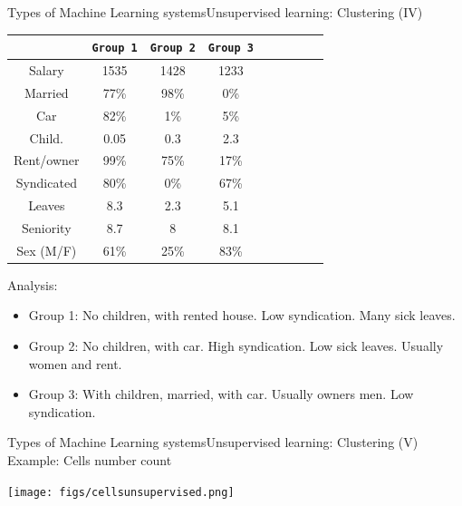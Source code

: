 \documentclass[10pt,compress]{beamer} %
\begin{document}
\begin{frame}{Types of Machine Learning systems}{Unsupervised learning: Clustering (IV)}

	\begin{center}
	\begin{tabular}{ccccccccc}\hline
				    & \texttt{Group 1} & \texttt{Group 2} & \texttt{Group 3} \\\hline
		 Salary     & 1535    		   & 1428             & 1233       \\
		 Married    & 77\%    		   & 98\% 			  & 0\%        \\
		 Car        & 82\%    		   & 1\% 			  & 5\%        \\
		 Child.     & 0.05    		   & 0.3 			  & 2.3        \\
		 Rent/owner & 99\%    		   & 75\% 			  & 17\%       \\
		 Syndicated & 80\%    		   & 0\% 			  & 67\%       \\
		 Leaves     & 8.3     		   & 2.3 			  & 5.1        \\
		 Seniority  & 8.7     		   & 8 				  & 8.1        \\
		 Sex (M/F)  & 61\%    		   & 25\% 			  & 83\%       \\
		 \hline
	 \end{tabular}
	 \end{center}
	 Analysis:
	 \begin{itemize}
	 	\item Group 1: No children, with rented house. Low syndication. Many sick leaves.
		\item Group 2: No children, with car. High syndication. Low sick leaves. Usually women and rent.
		\item Group 3: With children, married, with car. Usually owners men. Low syndication.
	 \end{itemize}	
\end{frame}

\begin{frame}{Types of Machine Learning systems}{Unsupervised learning: Clustering (V)}
	Example: Cells number count

	\bigskip

	\texttt{[image: figs/cellsunsupervised.png]}
\end{frame}
\end{document}
